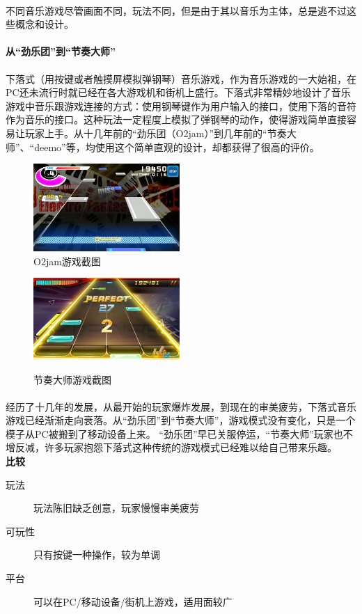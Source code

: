 \documentclass{article}
\begin{document}
\paragraph{}
不同音乐游戏尽管画面不同，玩法不同，但是由于其以音乐为主体，总是逃不过这些概念和设计。
\paragraph{从“劲乐团”到“节奏大师”}
\paragraph{}
下落式（用按键或者触摸屏模拟弹钢琴）音乐游戏，作为音乐游戏的一大始祖，在PC还未流行时就已经在各大游戏机和街机上盛行。下落式非常精妙地设计了音乐游戏中音乐跟游戏连接的方式：使用钢琴键作为用户输入的接口，使用下落的音符作为音乐的接口。这种玩法一定程度上模拟了弹钢琴的动作，使得游戏简单直接容易让玩家上手。从十几年前的“劲乐团（O2jam）”到几年前的“节奏大师”、“deemo”等，均使用这个简单直观的设计，却都获得了很高的评价。
\begin{figure}[H]
\begin{minipage}{0.5\linewidth}
  \includegraphics[width=15em]{O2jam.png}\\
  \caption{O2jam游戏截图}\label{3-1}
\end{minipage}
\begin{minipage}{0.5\linewidth}
  \includegraphics[width=15em]{rm.png}\\
  \caption{节奏大师游戏截图}\label{3-2}
\end{minipage}
\end{figure}
\paragraph{}
经历了十几年的发展，从最开始的玩家爆炸发展，到现在的审美疲劳，下落式音乐游戏已经渐渐走向衰落。从“劲乐团”到“节奏大师”，游戏模式没有变化，只是一个模子从PC被搬到了移动设备上来。
“劲乐团”早已关服停运，“节奏大师”玩家也不增反减，许多玩家抱怨下落式这种传统的游戏模式已经难以给自己带来乐趣。\\
\textbf{比较}
\begin{description}
  \item[玩法] 玩法陈旧缺乏创意，玩家慢慢审美疲劳
  \item[可玩性] 只有按键一种操作，较为单调
  \item[平台] 可以在PC/移动设备/街机上游戏，适用面较广
\end{description}
\end{document}
